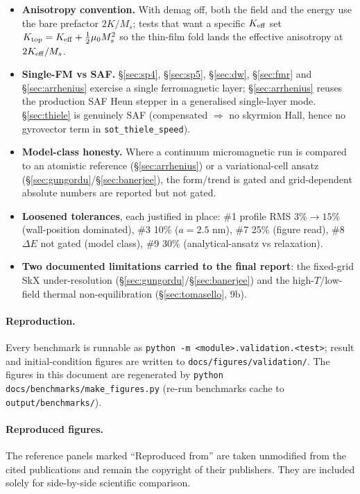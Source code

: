 \documentclass[11pt]{article}
\begin{document}
\begin{itemize}
\item \textbf{Anisotropy convention.} With demag off, both the
field and the energy use the bare prefactor $2K/M_s$; tests that
want a specific $K_{\rm eff}$ set $K_{\rm top}=K_{\rm eff}+
\tfrac12\mu_0 M_s^2$ so the thin-film fold lands the effective
anisotropy at $2K_{\rm eff}/M_s$.
\item \textbf{Single-FM vs SAF.} \S\ref{sec:sp4}, \S\ref{sec:sp5},
\S\ref{sec:dw}, \S\ref{sec:fmr} and \S\ref{sec:arrhenius} exercise a
single ferromagnetic layer; \S\ref{sec:arrhenius} reuses the
production SAF Heun stepper in a generalised single-layer mode.
\S\ref{sec:thiele} is genuinely SAF (compensated $\Rightarrow$ no
skyrmion Hall, hence no gyrovector term in
\texttt{sot\_thiele\_speed}).
\item \textbf{Model-class honesty.} Where a continuum micromagnetic
run is compared to an atomistic reference (\S\ref{sec:arrhenius}) or
a variational-cell ansatz (\S\ref{sec:gungordu}/\S\ref{sec:banerjee}),
the form/trend is gated and grid-dependent absolute numbers are
reported but not gated.
\item \textbf{Loosened tolerances}, each justified in place: \#1
profile RMS $3\%\!\to\!15\%$ (wall-position dominated), \#3 10\%
($a=2.5$ nm), \#7 25\% (figure read), \#8 $\Delta E$ not gated
(model class), \#9 30\% (analytical-ansatz vs relaxation).
\item \textbf{Two documented limitations carried to the final
report}: the fixed-grid SkX under-resolution
(\S\ref{sec:gungordu}/\S\ref{sec:banerjee}) and the high-$T$/low-field
thermal non-equilibration (\S\ref{sec:tomasello}, 9b).
\end{itemize}

\paragraph{Reproduction.} Every benchmark is runnable as
\texttt{python -m <module>.validation.<test>}; result and
initial-condition figures are written to
\texttt{docs/figures/validation/}. The figures in this document are
regenerated by \texttt{python docs/benchmarks/make\_figures.py}
(re-run benchmarks cache to \texttt{output/benchmarks/}).

\paragraph{Reproduced figures.} The reference panels marked
``Reproduced from'' are taken unmodified from the cited publications
and remain the copyright of their publishers. They are included solely
for side-by-side scientific comparison.
\end{document}
